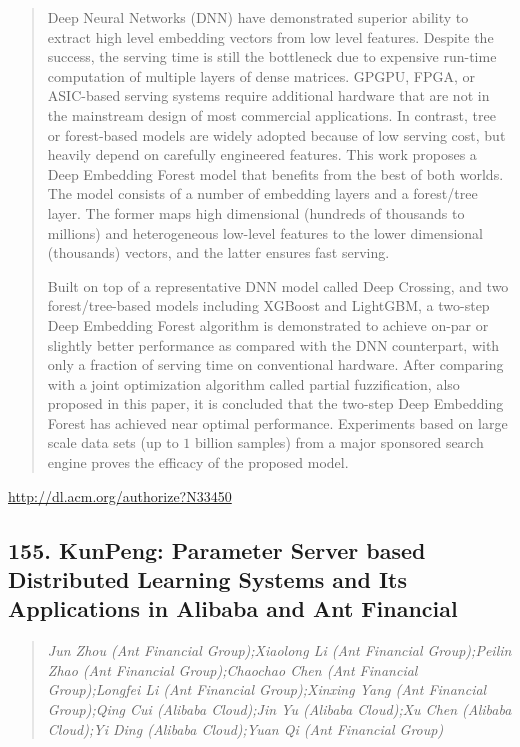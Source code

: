 \documentclass{article}
\begin{document}
\begin{quote}
Deep Neural Networks (DNN) have demonstrated superior ability to extract high level embedding vectors from low level features. Despite the success, the serving time is still the bottleneck due to expensive run-time computation of multiple layers of dense matrices. GPGPU, FPGA, or ASIC-based serving systems require additional hardware that are not in the mainstream design of most commercial applications. In contrast, tree or forest-based models are widely adopted because of low serving cost, but heavily depend on carefully engineered features. This work proposes a Deep Embedding Forest model that benefits from the best of both worlds. The model consists of a number of embedding layers and a forest/tree layer. The former maps high dimensional (hundreds of thousands to millions) and heterogeneous low-level features to the lower dimensional (thousands) vectors, and the latter ensures fast serving.







  Built on top of a representative DNN model called Deep Crossing, and two forest/tree-based models including XGBoost and LightGBM, a two-step Deep Embedding Forest algorithm is demonstrated to achieve on-par or slightly better performance as compared with the DNN counterpart, with only a fraction of serving time on conventional hardware. After comparing with a joint optimization algorithm called partial fuzzification, also proposed in this paper, it is concluded that the two-step Deep Embedding Forest has achieved near optimal performance. Experiments based on large scale data sets (up to $1$ billion samples) from a major sponsored search engine proves the efficacy of the proposed model.
\end{quote}

\href{http://dl.acm.org/authorize?N33450}{http://dl.acm.org/authorize?N33450}

\subsection{155. KunPeng: Parameter Server based Distributed Learning Systems and Its Applications in Alibaba and Ant Financial}

\begin{quote}
\footnotesize{\textit{Jun Zhou (Ant Financial Group);Xiaolong Li (Ant Financial Group);Peilin Zhao (Ant Financial Group);Chaochao Chen (Ant Financial Group);Longfei Li (Ant Financial Group);Xinxing Yang (Ant Financial Group);Qing Cui (Alibaba Cloud);Jin Yu (Alibaba Cloud);Xu Chen (Alibaba Cloud);Yi Ding (Alibaba Cloud);Yuan Qi (Ant Financial Group)}}

\end{quote}
\end{document}
